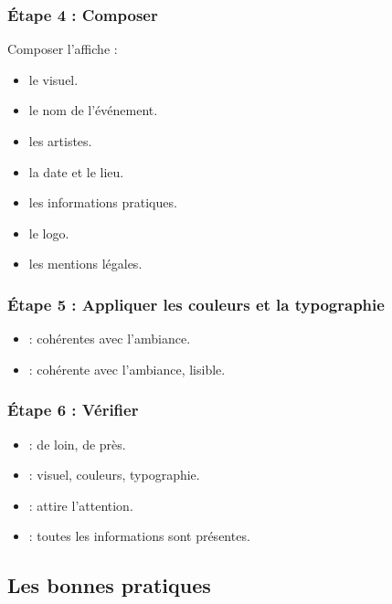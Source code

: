 \subsubsection{Étape 4 : Composer}

Composer l'affiche :

\begin{itemize}
    \item {} le visuel.
    \item {} le nom de l'événement.
    \item {} les artistes.
    \item {} la date et le lieu.
    \item {} les informations pratiques.
    \item {} le logo.
    \item {} les mentions légales.
\end{itemize}

\subsubsection{Étape 5 : Appliquer les couleurs et la typographie}

\begin{itemize}
    \item {} : cohérentes avec l'ambiance.
    \item {} : cohérente avec l'ambiance, lisible.
\end{itemize}

\subsubsection{Étape 6 : Vérifier}

\begin{itemize}
    \item {} : de loin, de près.
    \item {} : visuel, couleurs, typographie.
    \item {} : attire l'attention.
    \item {} : toutes les informations sont présentes.
\end{itemize}

\subsection{Les bonnes pratiques}

